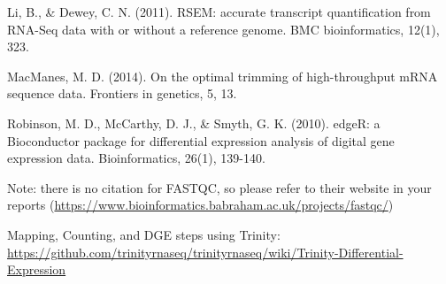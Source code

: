 \documentclass[]{article}
\begin{document}
Li, B., \& Dewey, C. N. (2011). RSEM: accurate transcript quantification
from RNA-Seq data with or without a reference genome. BMC
bioinformatics, 12(1), 323.

MacManes, M. D. (2014). On the optimal trimming of high-throughput mRNA
sequence data. Frontiers in genetics, 5, 13.

Robinson, M. D., McCarthy, D. J., \& Smyth, G. K. (2010). edgeR: a
Bioconductor package for differential expression analysis of digital
gene expression data. Bioinformatics, 26(1), 139-140.

Note: there is no citation for FASTQC, so please refer to their website
in your reports
(\url{https://www.bioinformatics.babraham.ac.uk/projects/fastqc/})

Mapping, Counting, and DGE steps using Trinity:
\url{https://github.com/trinityrnaseq/trinityrnaseq/wiki/Trinity-Differential-Expression}
\end{document}
